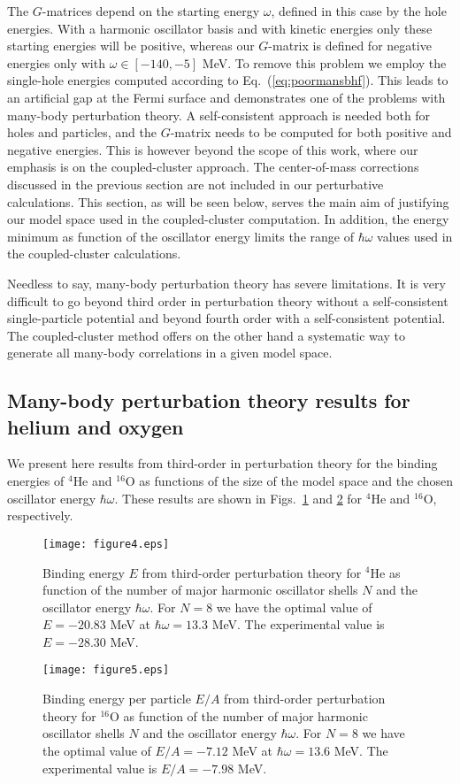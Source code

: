\documentclass[aps,prc,twocolumn,floatfix]{revtex4}
\begin{document}
The $G$-matrices depend on the starting energy $\omega$, defined 
in this case by the hole energies.
With a harmonic oscillator basis and with kinetic energies only 
these starting energies will be positive, whereas
our $G$-matrix is defined for negative energies only with  $\omega \in [-140,-5]$ MeV.
To remove this problem we employ the  single-hole energies computed
according to Eq.~(\ref{eq:poormansbhf}). This leads to an artificial gap at the Fermi surface
and demonstrates one of the problems with many-body perturbation theory. A self-consistent 
approach is needed both for holes and particles, and the $G$-matrix needs to be 
computed for both
positive and negative energies. This is however beyond the scope of this work, where our
emphasis is on the coupled-cluster approach.  The center-of-mass corrections discussed in the previous
section are not included in our perturbative calculations.
This section, as will be seen below, serves the main aim
of justifying our model space used in the coupled-cluster computation. 
In addition, the energy minimum as function of the oscillator energy limits the range
of $\hbar\omega$ values used in the coupled-cluster calculations. 
 
Needless to say, many-body perturbation theory 
has severe limitations. It is very difficult to go beyond third order
in perturbation theory 
without a self-consistent single-particle potential and beyond 
fourth order with a self-consistent potential.  
The coupled-cluster method offers on the other hand a systematic way to generate all
many-body correlations in a given model space. 

\subsection{Many-body perturbation theory results for helium and oxygen}
We present here results from third-order in perturbation theory for the 
binding energies of $^{4}$He and $^{16}$O as functions of the size of the model
space and the chosen oscillator energy $\hbar\omega$.
These results are shown in Figs.~\ref{fig:mbpthe} and \ref{fig:mbptox} for 
$^{4}$He and $^{16}$O, respectively.
\begin{figure}[hbtp]
\vspace{0.25in}
\texttt{[image: figure4.eps]}
\caption{Binding energy $E$ 
from third-order perturbation theory for $^{4}$He as function
of the number of major harmonic oscillator shells $N$ 
and the oscillator energy $\hbar\omega$. For $N=8$ we have the optimal value of
$E=-20.83$ MeV at $\hbar\omega = 13.3$ MeV. The experimental value is
$E=-28.30$ MeV.}
\label{fig:mbpthe}
\end{figure}
\begin{figure}
\vspace{0.25in}
\texttt{[image: figure5.eps]}
\caption{Binding energy per particle $E/A$ 
from third-order perturbation theory for $^{16}$O as function 
of the number of major harmonic oscillator shells $N$ 
and the oscillator energy $\hbar\omega$. For $N=8$ we have the optimal value of
$E/A=-7.12$ MeV at $\hbar\omega = 13.6$ MeV. The experimental value is
$E/A=-7.98$ MeV.}
\label{fig:mbptox}
\end{figure}
\end{document}
